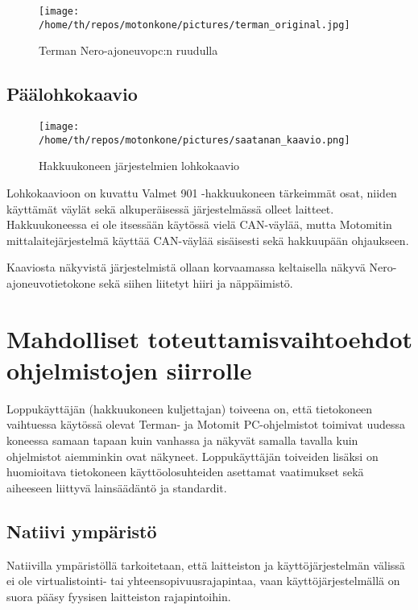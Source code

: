 \documentclass[11pt,a4paper,oneside,article]{memoir}
\begin{document}
\begin{figure}[H]
\centering
\texttt{[image: /home/th/repos/motonkone/pictures/terman\_original.jpg]}
\caption{Terman Nero-ajoneuvopc:n ruudulla}
\end{figure}

\newpage
\section{Päälohkokaavio}

\begin{figure}[H]
\centering
\texttt{[image: /home/th/repos/motonkone/pictures/saatanan\_kaavio.png]}
\caption{Hakkuukoneen järjestelmien lohkokaavio}
\end{figure}

Lohkokaavioon on kuvattu Valmet 901 -hakkuukoneen tärkeimmät osat, niiden käyttämät väylät sekä alkuperäisessä järjestelmässä olleet laitteet. Hakkuukoneessa ei ole itsessään käytössä vielä CAN-väylää, mutta Motomitin mittalaitejärjestelmä käyttää CAN-väylää sisäisesti sekä hakkuupään ohjaukseen.

Kaaviosta näkyvistä järjestelmistä ollaan korvaamassa keltaisella näkyvä Nero-ajoneuvotietokone sekä siihen liitetyt hiiri ja näppäimistö.

\newpage
\chapter{Mahdolliset toteuttamisvaihtoehdot ohjelmistojen siirrolle}

Loppukäyttäjän (hakkuukoneen kuljettajan) toiveena on, että tietokoneen vaihtuessa käytössä olevat Terman- ja Motomit PC-ohjelmistot toimivat uudessa koneessa samaan tapaan kuin vanhassa ja näkyvät samalla tavalla kuin ohjelmistot aiemminkin ovat näkyneet. Loppukäyttäjän toiveiden lisäksi on huomioitava tietokoneen käyttöolosuhteiden asettamat vaatimukset sekä aiheeseen liittyvä lainsäädäntö ja standardit.

\section{Natiivi ympäristö}

Natiivilla ympäristöllä tarkoitetaan, että laitteiston ja käyttöjärjestelmän välissä ei ole virtualistointi- tai yhteensopivuusrajapintaa, vaan käyttöjärjestelmällä on suora pääsy fyysisen laitteiston rajapintoihin.

\end{document}
